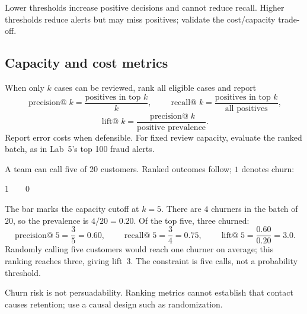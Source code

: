 \begin{keyidea}
Lower thresholds increase positive decisions and cannot reduce recall. Higher thresholds reduce alerts but may miss positives; validate the cost/capacity trade-off.
\end{keyidea}

\subsection{Capacity and cost metrics}
\label{sec:capacity-metrics}

When only $k$ cases can be reviewed, rank all eligible cases and report
\[
\operatorname{precision@}k=\frac{\text{positives in top }k}{k},
\qquad
\operatorname{recall@}k=\frac{\text{positives in top }k}{\text{all positives}},
\]
\[
\operatorname{lift@}k=
\frac{\operatorname{precision@}k}{\text{positive prevalence}}.
\]
Report error costs when defensible. For fixed review capacity, evaluate the ranked batch, as in Lab~5's top 100 fraud alerts.

\begin{workedexample}
A team can call five of 20 customers. Ranked outcomes follow; $1$ denotes churn:
\begin{center}\ttfamily\small
1\ \ \vrule\ \ 0
\end{center}
The bar marks the capacity cutoff at $k=5$. There are $4$ churners in the batch of $20$, so the prevalence is $4/20=0.20$. Of the top five, three churned:
\[
  \operatorname{precision@}5=\frac{3}{5}=0.60,
  \qquad
  \operatorname{recall@}5=\frac{3}{4}=0.75,
  \qquad
  \operatorname{lift@}5=\frac{0.60}{0.20}=3.0.
\]
Randomly calling five customers would reach one churner on average; this ranking reaches three, giving lift~3. The constraint is five calls, not a probability threshold.
\end{workedexample}

\begin{pitfall}
Churn risk is not persuadability. Ranking metrics cannot establish that contact causes retention; use a causal design such as randomization.
\end{pitfall}


